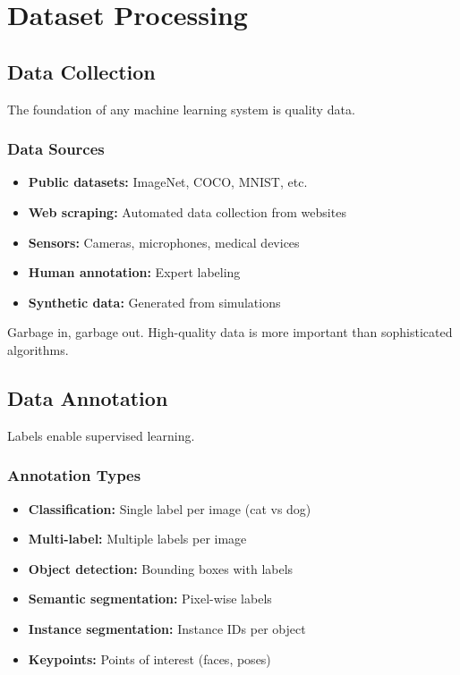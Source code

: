 %

\clearpage
\cleardoublepage

\chapter{Dataset Processing}

\section{Data Collection}

The foundation of any machine learning system is quality data.

\subsection{Data Sources}

\begin{itemize}
    \item \textbf{Public datasets:} ImageNet, COCO, MNIST, etc.
    \item \textbf{Web scraping:} Automated data collection from websites
    \item \textbf{Sensors:} Cameras, microphones, medical devices
    \item \textbf{Human annotation:} Expert labeling
    \item \textbf{Synthetic data:} Generated from simulations
\end{itemize}

\begin{note}
Garbage in, garbage out. High-quality data is more important than sophisticated algorithms.
\end{note}

\section{Data Annotation}

Labels enable supervised learning.

\subsection{Annotation Types}

\begin{itemize}
    \item \textbf{Classification:} Single label per image (cat vs dog)
    \item \textbf{Multi-label:} Multiple labels per image
    \item \textbf{Object detection:} Bounding boxes with labels
    \item \textbf{Semantic segmentation:} Pixel-wise labels
    \item \textbf{Instance segmentation:} Instance IDs per object
    \item \textbf{Keypoints:} Points of interest (faces, poses)
\end{itemize}

